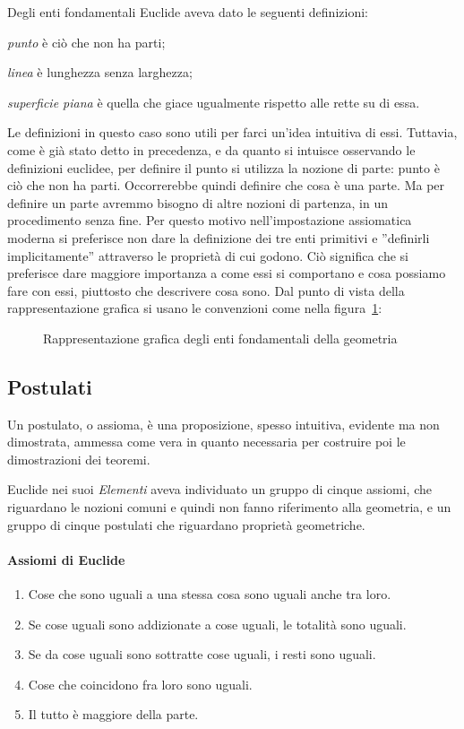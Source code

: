 {Degli enti fondamentali Euclide aveva dato le seguenti definizioni:
\begin{itemize*}
\item \emph{punto} è ciò che non ha parti;
\item \emph{linea} è lunghezza senza larghezza;
\item \emph{superficie piana} è quella che giace ugualmente rispetto alle rette su di essa.
\end{itemize*}
Le definizioni in questo caso sono utili per farci un'idea intuitiva di essi. Tuttavia, come è già stato detto in precedenza, e da quanto si intuisce osservando le definizioni euclidee, per definire il punto si utilizza la nozione di parte: punto è ciò che non ha parti. Occorrerebbe quindi definire che cosa è una parte. Ma per definire un parte avremmo bisogno di altre nozioni di partenza, in un procedimento senza fine. Per questo motivo nell'impostazione assiomatica moderna si preferisce non dare la definizione dei tre enti primitivi e ”definirli implicitamente” attraverso le proprietà di cui godono. Ciò significa che si preferisce dare maggiore importanza a come essi si comportano e cosa possiamo fare con essi, piuttosto che descrivere cosa sono.
Dal punto di vista della rappresentazione grafica si usano le convenzioni come nella figura~\ref{fig:1.2}:
% 
\begin{figure}[h b]
 \centering
 \caption{Rappresentazione grafica degli enti fondamentali della geometria}\label{fig:1.2}
\end{figure}

\subsection{Postulati}

Un postulato, o assioma, è una proposizione, spesso intuitiva, evidente ma non dimostrata, ammessa come vera in quanto necessaria per costruire poi le dimostrazioni dei teoremi.

Euclide nei suoi \emph{Elementi} aveva individuato un gruppo di cinque assiomi, che riguardano le nozioni comuni e quindi non fanno riferimento alla geometria, e un gruppo di cinque postulati che riguardano proprietà geometriche.

\paragraph{Assiomi di Euclide}
\begin{enumerate}[label=\Roman{*}.]
\item Cose che sono uguali a una stessa cosa sono uguali anche tra loro.
\item Se cose uguali sono addizionate a cose uguali, le totalità sono uguali.
\item Se da cose uguali sono sottratte cose uguali, i resti sono uguali.
\item Cose che coincidono fra loro sono uguali.
\item Il tutto è maggiore della parte.
\end{enumerate}

}
